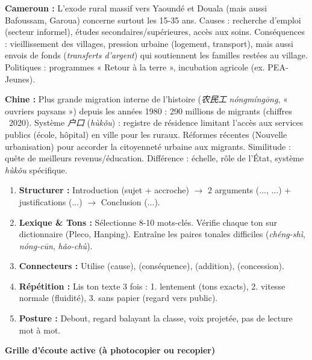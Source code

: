 \documentclass[11pt]{article}
\newcommand{\zh}[1]{\ifmmode\text{#1}\else{#1}\fi}
\begin{document}
\begin{savaistu}
\textbf{Cameroun :} L'exode rural massif vers Yaoundé et Douala (mais aussi Bafoussam, Garoua) concerne surtout les 15-35 ans. Causes : recherche d'emploi (secteur informel), études secondaires/supérieures, accès aux soins. Conséquences : vieillissement des villages, pression urbaine (logement, transport), mais aussi envois de fonds (\emph{transferts d'argent}) qui soutiennent les familles restées au village. Politiques : programmes « Retour à la terre », incubation agricole (ex. PEA-Jeunes).

\textbf{Chine :} Plus grande migration interne de l'histoire (\emph{农民工} \emph{nóngmíngōng}, « ouvriers paysans ») depuis les années 1980 : 290 millions de migrants (chiffres ~2020). Système \emph{户口} (\emph{hùkǒu}) : registre de résidence limitant l'accès aux services publics (école, hôpital) en ville pour les ruraux. Réformes récentes (Nouvelle urbanisation) pour accorder la citoyenneté urbaine aux migrants. Similitude : quête de meilleurs revenus/éducation. Différence : échelle, rôle de l'État, système \emph{hùkǒu} spécifique.
\end{savaistu}

\begin{methode}
\begin{enumerate}
\item \textbf{Structurer :} Introduction (sujet + accroche) $\rightarrow$ 2 arguments (\zh{首先}..., \zh{其次}...) + justifications (\zh{因为}...) $\rightarrow$ Conclusion (\zh{总之}...).
\item \textbf{Lexique \& Tons :} Sélectionne 8-10 mots-clés. Vérifie chaque ton sur dictionnaire (Pleco, Hanping). Entraîne les paires tonales difficiles (\emph{chéng-shì}, \emph{nóng-cūn}, \emph{hǎo-chù}).
\item \textbf{Connecteurs :} Utilise \zh{因为} (cause), \zh{所以} (conséquence), \zh{也} (addition), \zh{但是} (concession).
\item \textbf{Répétition :} Lis ton texte 3 fois : 1. lentement (tons exacts), 2. vitesse normale (fluidité), 3. sans papier (regard vers public).
\item \textbf{Posture :} Debout, regard balayant la classe, voix projetée, pas de lecture mot à mot.
\end{enumerate}
\end{methode}

\textbf{Grille d'écoute active (à photocopier ou recopier)}
\end{document}

